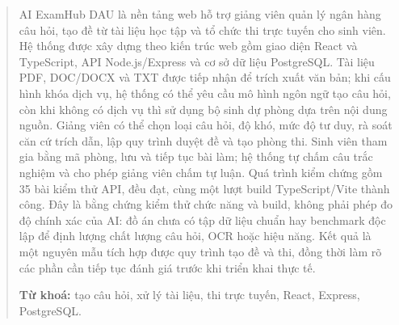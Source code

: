 \begin{abstract}

AI ExamHub DAU là nền tảng web hỗ trợ giảng viên quản lý ngân hàng câu hỏi,
tạo đề từ tài liệu học tập và tổ chức thi trực tuyến cho sinh viên. Hệ thống
được xây dựng theo kiến trúc web gồm giao diện React và TypeScript, API
Node.js/Express và cơ sở dữ liệu PostgreSQL. Tài liệu PDF, DOC/DOCX và TXT
được tiếp nhận để trích xuất văn bản; khi cấu hình khóa dịch vụ, hệ thống có
thể yêu cầu mô hình ngôn ngữ tạo câu hỏi, còn khi không có dịch vụ thì sử
dụng bộ sinh dự phòng dựa trên nội dung nguồn. Giảng viên có thể chọn loại
câu hỏi, độ khó, mức độ tư duy, rà soát căn cứ trích dẫn, lập quy trình duyệt
đề và tạo phòng thi. Sinh viên tham gia bằng mã phòng, lưu và tiếp tục bài
làm; hệ thống tự chấm câu trắc nghiệm và cho phép giảng viên chấm tự luận.
Quá trình kiểm chứng gồm 35 bài kiểm thử API, đều đạt, cùng một lượt build
TypeScript/Vite thành công. Đây là bằng chứng kiểm thử chức năng và build,
không phải phép đo độ chính xác của AI: đồ án chưa có tập dữ liệu chuẩn hay
benchmark độc lập để định lượng chất lượng câu hỏi, OCR hoặc hiệu năng. Kết
quả là một nguyên mẫu tích hợp được quy trình tạo đề và thi, đồng thời làm
rõ các phần cần tiếp tục đánh giá trước khi triển khai thực tế.

\vspace{0.8em}
\noindent\textbf{Từ khoá:} tạo câu hỏi, xử lý tài liệu, thi trực tuyến,
React, Express, PostgreSQL.
\end{abstract}
